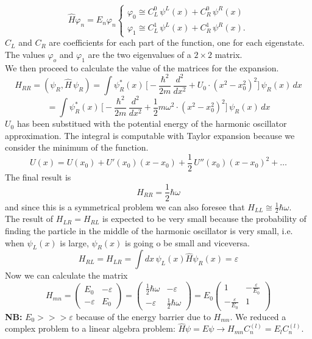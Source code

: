 \[
\hat{H}\varphi_n=E_n\varphi_n
\begin{cases}
\varphi_0 \cong C_L^0\,\psi^L(x)+C_R^0\,\psi^R(x)\\
\varphi_1 \cong C_L^1\,\psi^L(x)+C_R^1\,\psi^R(x).
\end{cases}
\]
$C_L$ and $C_R$ are coefficients for each part of the function, one for each eigenstate. The values $\varphi_o$ and $\varphi_1$ are the two eigenvalues of a $2 \times 2 $ matrix.\\
We then proceed to calculate the value of the matrices for the expansion.\\
\[
H_{RR}=(\psi_R,\hat{H}\,\psi_R)= \int\psi_R^*(x)\,\bigg[-\frac{\hbar^2}{2m}\,\frac{d^2}{dx^2}+U_0\cdot(x^2-x_0^2)^2\bigg]\,\psi_R(x)\,dx\]
\[
=\int\psi_R^*(x)\,\bigg[-\frac{\hbar^2}{2m}\,\frac{d^2}{dx^2}+\frac{1}{2}m\omega^2\cdot(x^2-x_0^2)^2\bigg]\,\psi_R(x)\,dx
\]
$U_0$ has been substitued with the potential energy of the harmonic oscillator approximation. The integral is computable with Taylor expansion because we consider the minimum of the function.
\[
U(x)=U(x_0)+U'(x_0)(x-x_0)+\frac{1}{2}\,U''(x_0)(x-x_0)^2+\dots\]
The final result is
\[
H_{RR}=\frac{1}{2}\hbar\omega
\]
and since this is a symmetrical problem we can also foresee that $H_{LL}\cong\frac{1}{2}\hbar\omega$.\\
The result of $H_{LR}=H_{RL}$ is expected to be very small because the probability of finding the particle in the middle of the harmonic oscillator is very small, i.e. when $\psi_L(x)$ is large, $\psi_R(x)$ is going o be small and viceversa.
\[
H_{RL}=H_{LR}=\int dx\,\psi_L(x)\hat{H}\psi_R(x) = \varepsilon
\]
Now we can calculate the matrix
\[
H_{mn}=
\begin{pmatrix}
E_0 & -\varepsilon\\
-\varepsilon & E_0
\end{pmatrix}
=
\begin{pmatrix}
\frac{1}{2}\hbar\omega & -\varepsilon\\
-\varepsilon & \frac{1}{2}\hbar\omega
\end{pmatrix}
=
E_0
\begin{pmatrix}
1 & -\frac{\varepsilon}{E_0}\\
-\frac{\varepsilon}{E_0} & 1
\end{pmatrix}
\]
\textbf{NB:} $E_0>>>\varepsilon$ because of the energy barrier due to $H_{mn}$.
\newline
We reduced a complex problem to a linear algebra problem: $\hat{H}\psi=E\psi \rightarrow H_{mn}C_n^{(l)}=E_lC_n^{(l)}$.\\
